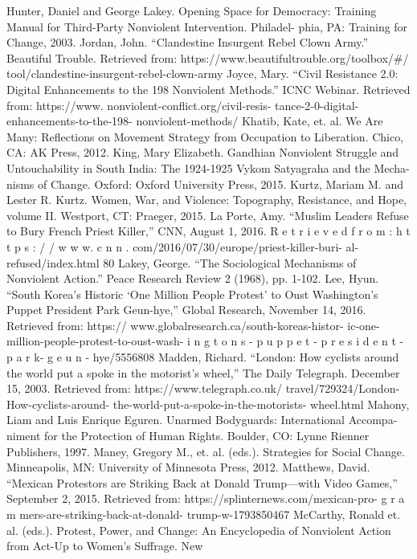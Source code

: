 \documentclass[twoside,a4paper,12pt,fleqn,openany]{extbook}
\begin{document}
Hunter, Daniel and George Lakey. Opening
Space for Democracy: Training Manual for
Third-Party Nonviolent Intervention. Philadel-
phia, PA: Training for Change, 2003.
Jordan, John. “Clandestine Insurgent Rebel
Clown Army.” Beautiful Trouble. Retrieved from:
https://www.beautifultrouble.org/toolbox/#/
tool/clandestine-insurgent-rebel-clown-army
Joyce, Mary. “Civil Resistance 2.0: Digital
Enhancements to the 198 Nonviolent Methods.”
ICNC Webinar. Retrieved from: https://www.
nonviolent-conflict.org/civil-resis-
tance-2-0-digital-enhancements-to-the-198-
nonviolent-methods/
Khatib, Kate, et. al. We Are Many: Reflections
on Movement Strategy from Occupation to
Liberation. Chico, CA: AK Press, 2012.
King, Mary Elizabeth. Gandhian Nonviolent
Struggle and Untouchability in South India: The
1924-1925 Vykom Satyagraha and the Mecha-
nisms of Change. Oxford: Oxford University
Press, 2015.
Kurtz, Mariam M. and Lester R. Kurtz. Women,
War, and Violence: Topography, Resistance, and
Hope, volume II. Westport, CT: Praeger, 2015.
La Porte, Amy. “Muslim Leaders Refuse to Bury
French Priest Killer,” CNN, August 1, 2016.
R e t r i e v e d f r o m : h t t p s : / / w w w. c n n .
com/2016/07/30/europe/priest-killer-buri-
al-refused/index.html
80
Lakey, George. “The Sociological Mechanisms
of Nonviolent Action.” Peace Research Review
2 (1968), pp. 1-102.
Lee, Hyun. “South Korea’s Historic ‘One Million
People Protest’ to Oust Washington’s Puppet
President Park Geun-hye,” Global Research,
November 14, 2016. Retrieved from: https://
www.globalresearch.ca/south-koreas-histor-
ic-one-million-people-protest-to-oust-wash-
i n g t o n s - p u p p e t - p r e s i d e n t - p a r k- g e u n -
hye/5556808
Madden, Richard. “London: How cyclists around
the world put a spoke in the motorist’s wheel,”
The Daily Telegraph. December 15, 2003.
Retrieved from: https://www.telegraph.co.uk/
travel/729324/London-How-cyclists-around-
the-world-put-a-spoke-in-the-motorists-
wheel.html
Mahony, Liam and Luis Enrique Eguren.
Unarmed Bodyguards: International Accompa-
niment for the Protection of Human Rights.
Boulder, CO: Lynne Rienner Publishers, 1997.
Maney, Gregory M., et. al. (eds.). Strategies for
Social Change. Minneapolis, MN: University of
Minnesota Press, 2012.
Matthews, David. “Mexican Protestors are
Striking Back at Donald Trump—with Video
Games,” September 2, 2015. Retrieved from:
https://splinternews.com/mexican-pro-
g r a m mers-are-striking-back-at-donald-
trump-w-1793850467
McCarthy, Ronald et. al. (eds.). Protest, Power,
and Change: An Encyclopedia of Nonviolent
Action from Act-Up to Women’s Suffrage. New
\end{document}
